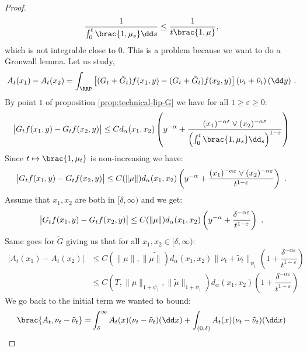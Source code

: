 \begin{proof}
    \begin{align*}
        \dfrac{1}{\int_0^t \brac{1,\mu_s} \dd s} \leq \dfrac{1}{t\brac{1,\mu}},
    \end{align*}
    which is not integrable close to $0$. This is a problem because we want to do a Gronwall lemma. Let us study,
    \begin{align*}
        A_t(x_1) - A_t(x_2) = \int_{\RRP} \left[(G_t + \tilde{G}_t)f(x_1,y) - (G_t + \tilde{G}_t)f(x_2,y)\right] \left(\nu_t + \tilde{\nu}_t\right)(\dd y)\ .
    \end{align*}
    By point $1$ of proposition \ref{prop:technical-lip-G} we have for all $1 \geq \varepsilon \geq 0$:
    \begin{align*}
        \left|G_tf(x_1,y) - G_tf(x_2,y) \vphantom{A^2}\right| \leq Cd_\alpha(x_1,x_2) \left( y^{-\alpha} + \dfrac{(x_1)^{-\alpha\varepsilon} \vee (x_2)^{-\alpha\varepsilon}}{\left(\int_0^t \brac{1,\mu_s} \dd_s\right)^{1 - \varepsilon}}\right)
    \end{align*}
    Since $t \mapsto \brac{1,\mu_t}$ is non-increasing we have:
    \begin{align*}
        \left|G_tf(x_1,y) - G_tf(x_2,y) \vphantom{A^2}\right| \leq C(\|\mu\|)d_\alpha(x_1,x_2) \left( y^{-\alpha} + \dfrac{(x_1)^{-\alpha\varepsilon} \vee (x_2)^{-\alpha\varepsilon}}{t^{1 - \varepsilon}}\right)\ .
    \end{align*}
    Assume that $x_1,x_2 $ are both in $[\delta,\infty)$ and we get:
    \begin{align*}
        \left|G_tf(x_1,y) - G_tf(x_2,y) \vphantom{A^2}\right| \leq  C(\|\mu\|)d_\alpha(x_1,x_2)\left( y^{-\alpha} + \dfrac{\delta^{-\alpha\varepsilon}}{t^{1 - \varepsilon}}\right)\ .
    \end{align*}
    Same goes for $\tilde{G}$ giving us that for all $x_1,x_2 \in [\delta,\infty)$:
    \begin{align*}
        \left|A_t(x_1) - A_t(x_2)\right| &\leq  C(\|\mu\|,\|\tilde{\mu\|})d_\alpha(x_1,x_2)\| \nu_t + \tilde{\nu}_t\|_{\psi_1} \left( 1 + \dfrac{\delta^{-\alpha\varepsilon}}{t^{1 - \varepsilon}}\right) \\
        &\leq C(T,\|\mu\|_{1 + \psi_1},\|\tilde{\mu}\|_{1 + \psi_1})d_\alpha(x_1,x_2)\left( 1 + \dfrac{\delta^{-\alpha\varepsilon}}{t^{1 - \varepsilon}}\right)
    \end{align*}
    We go back to the initial term we wanted to bound:
    \begin{align*}
        \brac{A_t,\nu_t - \tilde{\nu}_t} =& \int_\delta^\infty A_t(x) (\nu_t - \tilde{\nu}_t)(\dd x) + \int_{(0,\delta)} A_t(x) (\nu_t - \tilde{\nu}_t)(\dd x) \\

\end{align*}
\end{proof}
